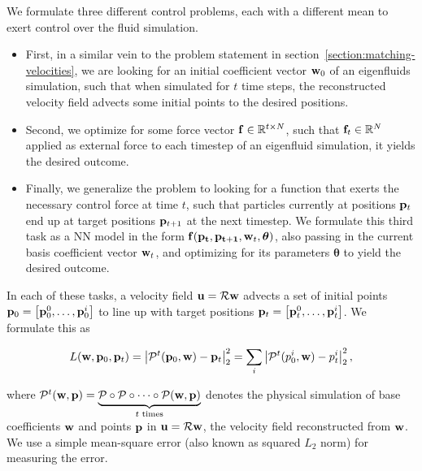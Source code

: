 We formulate three different control problems, each with a different mean to
exert control over the fluid simulation.
\begin{itemize}
  \item First, in a similar vein to the problem statement in
    section~\ref{section:matching-velocities}, we are looking for an initial
    coefficient vector $\vb{w}_0$ of an eigenfluids simulation, such that when
    simulated for $t$ time steps, the reconstructed velocity field advects some
    initial points to the desired positions.
  \item Second, we optimize for some force vector $\vb{f}\in \mathbb{R}^{t\times
    N}$, such that $\vb{f}_t \in \mathbb{R}^N$ applied as external force to each
    timestep of an eigenfluid simulation, it yields the desired outcome.
  \item Finally, we generalize the problem to looking for a function that exerts
    the necessary control force at time $t$, such that particles currently at
    positions $\vb{p}_t$ end up at target positions $\vb{p}_{t+1}$ at the
    next timestep. We formulate this third task as a \acf{NN} model in the
    form $\vb{f}(\vb{p_t}, \vb{p_{t+1}}, \vb{w}_{t}, \boldsymbol\theta)$, also
    passing in the current basis coefficient vector $\vb{w}_t$, and optimizing
    for its parameters $\boldsymbol\theta$ to yield the desired outcome.
\end{itemize}

In each of these tasks, a velocity field $\vb{u} = \mathcal{R}\vb{w}$ advects
a set of initial points $\vb{p}_0 = \left[\vb{p}_0^0,\dots, \vb{p}_0^i\right]$
to line up with target positions $\vb{p}_t = \left[\vb{p}_t^0, \dots,
\vb{p}_t^i\right]$.  We formulate this as 

\begin{equation}\label{eq:advecting-particles-loss}
  L(\vb{w}, \vb{p}_0, \vb{p}_t)
  = \left| \mathcal{P}^{t}(\vb{p}_0, \vb{w}) - \vb{p}_t\right|_2^2 
  = \sum_{i}\left|\mathcal{P}^{t}(p_0^i, \vb{w}) - p_t^i\right|_2^2, 
\end{equation}

where $\mathcal{P}^t(\vb{w}, \vb{p}) = \underbrace{\mathcal{P} \circ
\mathcal{P}\circ \dots \circ \mathcal{P}(\vb{w}, \vb{p})}_{t \text{ times}}$
denotes the physical simulation of base coefficients $\vb{w}$ and points
$\vb{p}$ in $\vb{u} = \mathcal{R}\vb{w}$, the velocity field reconstructed from
$\vb{w}$.  We use a simple mean-square error (also known as squared $L_2$ norm)
for measuring the error.

